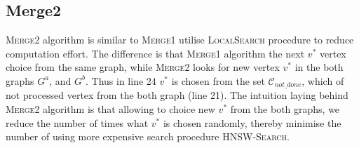 \documentclass{article}
\begin{document}
\subsection{Merge2}

\textsc{Merge2} algorithm is similar to \textsc{Merge1} utilise \textsc{LocalSearch} procedure to reduce computation effort. The difference is that \textsc{Merge1} algorithm the next $v^*$ vertex choice from the same graph, while \textsc{Merge2} looks for new vertex $v^*$ in the both graphs $G^a$, and $G^b$. Thus in line 24  $v^*$  is chosen from the set $\mathcal{C}_{not\_done}$, which of not processed vertex from the both graph (line 21). The intuition laying behind \textsc{Merge2} algorithm is that allowing to choice new $v^*$ from the both graphs, we reduce the number of times what $v^*$ is chosen randomly, thereby minimise the number of using more expensive search procedure \textsc{HNSW-Search}.
\end{document}
